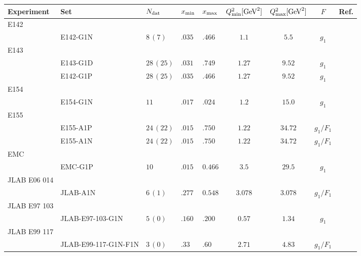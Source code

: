 \begin{tabularx}{1\pdfpagewidth}{llXXXcccc}
  \toprule \toprule
   Experiment    & Set  &  $N_{\textrm{dat}}$  &  $x_{\textrm{min}}$  &  $x_{\textrm{max}}$  & $Q^2_{\textrm{min}} [\textrm{GeV}^2]$ &  $Q^2_{\textrm{max}} [\textrm{GeV}^2]$ &    $F$    &  Ref. \\
  \midrule
   E142 
        \\       & E142-G1N & $8\,(7)$ & $.035$ & $.466$ & $1.1$ & $5.5$ & $g_1$ & \cite{E142:1996thl} \\
  \midrule
   E143 
        \\       &  E143-G1D  &   $28\,(25)$  &    $.031$       &      $.749$     &    $1.27$                   &       $9.52$                 &  $g_1$    & \cite{E143:1998hbs} \\       
                 &  E142-G1P  &   $28\,(25)$  &    $.035$       &      $.466$     &    $1.27$                   &       $9.52$                 &  $g_1$    & \cite{E143:1998hbs} \\
  \midrule
   E154 
        \\       &  E154-G1N  &   $11$         &    $.017$      &      $.024$      &   $ 1.2$                    & $15.0$                       & $g_1$     & \cite{E154:1997xfa} \\
  \midrule
   E155 
       \\        & E155-A1P   & $24\,(22)$      & $.015$        & $.750$          &  $1.22$                & $34.72$                & $g_1/F_1$          & \cite{E155:2000qdr}
       \\        & E155-A1N   & $24\,(22)$      & $.015$        & $.750$          &  $1.22$                & $34.72$                & $g_1/F_1$          & \cite{E155:2000qdr} \\
  \midrule
   EMC 
       \\        & EMC-G1P    & $10$         & $.015$       & $0.466$       &    $3.5$         & $29.5$                      & $g_1$          & \cite{EuropeanMuon:1989yki} \\
  \midrule
   JLAB E06 014
       \\        & JLAB-A1N   & $6\,(1)$     & $.277$       & $0.548$      & $3.078$    & $3.078$                  & $g_1/F_1$  & \cite{JeffersonLabHallA:2016neg} \\
  \midrule
   JLAB E97 103
       \\        & JLAB-E97-103-G1N & $5\,(0)$ & $.160$ & $.200$ & $0.57$ & $1.34$ & $g_1$ & \cite{Kramer:2002tt}\\
  \midrule
   JLAB E99 117 
       \\        & JLAB-E99-117-G1N-F1N & $3\,(0)$ & $.33$ & $.60$ & $2.71$ & $4.83$ & $g_1/F_1$ & \cite{JeffersonLabHallA:2004tea} \\

\end{tabularx}
